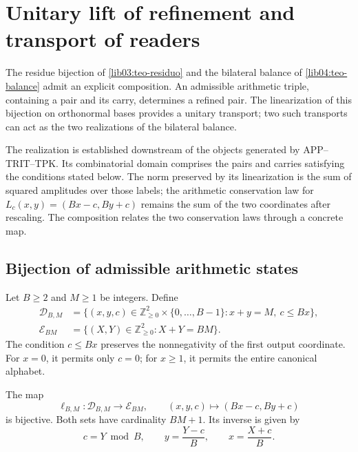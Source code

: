 \section{Unitary lift of refinement and transport of readers}
\label{lib05:levantamiento}

The residue bijection of \cref{lib03:teo-residuo} and the
bilateral balance of \cref{lib04:teo-balance} admit an
explicit composition. An admissible arithmetic triple, containing
a pair and its carry, determines a refined pair. The
linearization of this bijection on orthonormal bases provides
a unitary transport; two such transports can act
as the two realizations of the bilateral balance.

The realization is established downstream of the objects generated by
APP--TRIT--TPK. Its combinatorial domain comprises the pairs and
carries satisfying the conditions stated below. The norm
preserved by its linearization is the sum of squared amplitudes
over those labels; the arithmetic conservation law for
\(L_c(x,y)=(Bx-c,By+c)\) remains the sum of the two
coordinates after rescaling. The composition relates the two
conservation laws through a concrete map.

\subsection{Bijection of admissible arithmetic states}
\label{lib05:biyeccion}

Let \(B\geq2\) and \(M\geq1\) be integers. Define
\begin{align}
 \mathcal D_{B,M}
 &=\bigl\{(x,y,c)\in\mathbb Z_{\geq0}^2
                 \times\{0,\ldots,B-1\}:x+y=M,\ c\leq Bx\bigr\},
 \label{lib05:dominio}\\
 \mathcal E_{BM}
 &=\bigl\{(X,Y)\in\mathbb Z_{\geq0}^2:X+Y=BM\bigr\}.
 \label{lib05:codominio}
\end{align}
The condition \(c\leq Bx\) preserves the nonnegativity of the
first output coordinate. For \(x=0\), it permits only
\(c=0\); for \(x\geq1\), it permits the entire canonical alphabet.

\begin{theorem}
\label{lib05:teo-biyeccion}
The map
\begin{equation}
 \ell_{B,M}:\mathcal D_{B,M}\longrightarrow\mathcal E_{BM},
 \qquad (x,y,c)\longmapsto(Bx-c,By+c)
 \label{lib05:mapa-etiquetas}
\end{equation}
is bijective. Both sets have cardinality \(BM+1\). Its inverse
is given by
\begin{equation}
 c=Y\bmod B,\qquad y=\frac{Y-c}{B},\qquad x=\frac{X+c}{B}.
 \label{lib05:inversa-etiquetas}
\end{equation}
\end{theorem}

